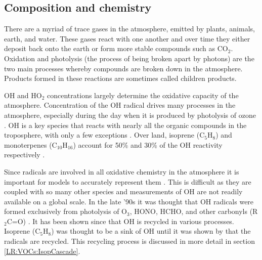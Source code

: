     
  \subsection{Composition and chemistry}
  \label{LR:Atmos:Chem}
        
    There are a myriad of trace gases in the atmosphere, emitted by plants, animals, earth, and water. 
    These gases react with one another and over time they either deposit back onto the earth or form more stable compounds such as CO$_2$.
    Oxidation and photolysis (the process of being broken apart by photons) are the two main processes whereby compounds are broken down in the atmosphere.
    Products formed in these reactions are sometimes called children products.
    
    OH and HO$_2$ concentrations largely determine the oxidative capacity of the atmosphere.
    Concentration of the OH radical drives many processes in the atmosphere, especially during the day when it is produced by photolysis of ozone \parencite{Atkinson2000}.
    OH is a key species that reacts with nearly all the organic compounds in the troposphere, with only a few exceptions \parencite{Atkinson2000}.
    Over land, isoprene (C$_5$H$_8$) and monoterpenes (C$_{10}$H$_{16}$) account for 50\% and 30\% of the OH reactivity respectively \parencite{Fuentes2000}.
    
    Since radicals are involved in all oxidative chemistry in the atmosphere it is important for models to accurately represent them \parencite[e.g.][]{Travis2016}.
    This is difficult as they are coupled with so many other species and measurements of OH are not readily available on a global scale.
    In the late '90s it was thought that OH radicals were formed exclusively from photolysis of O$_3$, HONO, HCHO, and other carbonyls (R$_2$C=O) \parencite{Atkinson2000}.
    It has been shown since that OH is recycled in various processes.
    Isoprene (C$_5$H$_8$) was thought to be a sink of OH until it was shown by \textcite{Paulot2009b} that the radicals are recycled.
    This recycling process is discussed in more detail in section \ref{LR:VOCs:IsopCascade}.
    
